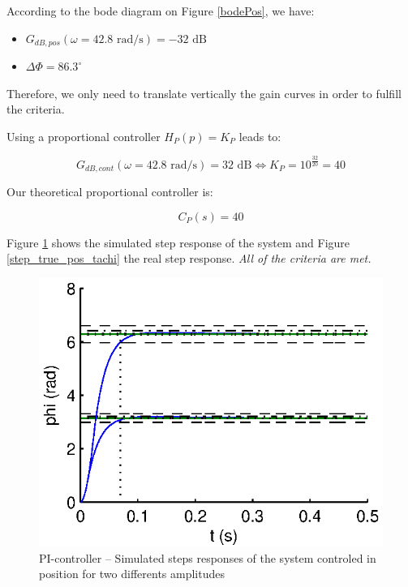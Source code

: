 According to the bode diagram on Figure \ref{bodePos}, we have:

\begin{itemize}
 \item $G_{dB,pos}(\omega = 42.8 \text{ rad/s}) = -32 \text{ dB}$
 \item $\Delta \Phi = 86.3^{\circ}$
\end{itemize}

Therefore, we only need to translate vertically the gain curves in order to fulfill the criteria.

Using a proportional controller $H_{P}(p) = K_P$ leads to:

$$ G_{dB,cont}(\omega = 42.8 \text{ rad/s}) = 32 \text{ dB} \Leftrightarrow K_P = 10^{\frac{32}{20}} = 40$$

Our theoretical proportional controller is:

$$C_{P}(s) = 40$$

Figure \ref{StepPPos} shows the simulated step response of the system and Figure \ref{step_true_pos_tachi} the real step response. \emph{All of the criteria are met.}

\begin{center}
\begin{figure}[ht]
 \includegraphics[width=\linewidth]{fig/StepPPos.eps}
 \caption{PI-controller -- Simulated steps responses of the system controled in position for two differents amplitudes}
 \label{StepPPos}
\end{figure}
\end{center}

